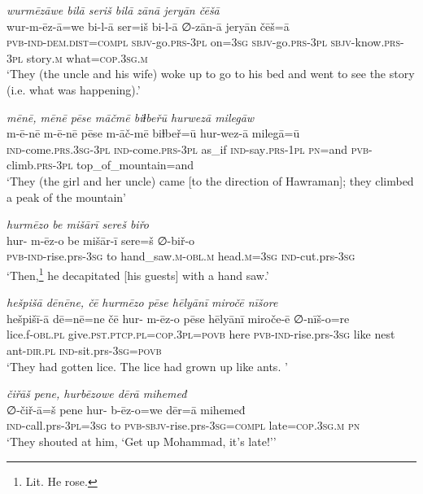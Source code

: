 \ea \label{ŽP.67}
\textit{wurmēzāwe bilā seriš bilā zānā jeryān čēšā} \\ 
\gll wur-m-ēz-ā=we bi-l-ā ser=iš bi-l-ā ∅-zān-ā jeryān čēš=ā \\ 
 \textsc{pvb-}\textsc{ind-}\textsc{dem.dist}\textsc{=compl} \textsc{sbjv-}go\textsc{.prs}\textsc{-3pl} on\textsc{=3sg} \textsc{sbjv-}go\textsc{.prs}\textsc{-3pl} \textsc{sbjv-}know\textsc{.prs}\textsc{-3pl} story\textsc{.m} what\textsc{=cop}\textsc{.3sg}\textsc{.m} \\ 
\glt `They (the uncle and his wife) woke up to go to his bed and went to see the story (i.e. what was happening).'
\z 
 
\ea \label{ŽP.186}
\textit{mēnē, mēnē pēse māčmē biɫbeřū hurwezā milegāw} \\ 
\gll m-ē-nē m-ē-nē pēse m-āč-mē biɫbeř=ū hur-wez-ā milegā=ū \\ 
 \textsc{ind-}come\textsc{.prs}\textsc{.3sg}\textsc{-3pl} \textsc{ind-}come\textsc{.prs}\textsc{-3pl} as\_if \textsc{ind-}say\textsc{.prs}\textsc{-1pl} \textsc{pn}=and \textsc{pvb-}climb\textsc{.prs}\textsc{-3pl} top\_of\_mountain=and \\ 
\glt `They (the girl and her uncle) came [to the direction of Hawraman]; they climbed a peak of the mountain'
\z 
 
\ea \label{BP.72}
\textit{hurmēzo be mišārī sereš biřo} \\ 
\gll hur- m-ēz-o be mišār-ī sere=š ∅-biř-o \\ 
 \textsc{pvb-}\textsc{ind-}rise.prs\textsc{-3sg} to hand\_saw\textsc{.m}\textsc{-obl}\textsc{.m} head\textsc{.m}\textsc{=3sg} \textsc{ind-}cut.prs\textsc{-3sg} \\ 
\glt `Then,\footnote{Lit. He rose.} he decapitated [his guests] with a hand saw.'
\z 
 
\ea \label{BP.151}
\textit{hešpišā dēnēne, čē hurmēzo pēse hēlyānī miročē nīšore} \\ 
\gll hešpišī-ā dē=nē=ne čē hur- m-ēz-o pēse hēlyānī miroče-ē ∅-nīš-o=re \\ 
 lice.f\textsc{-obl}\textsc{.pl} give\textsc{.pst}\textsc{.ptcp}\textsc{.pl}\textsc{=cop}\textsc{.3pl}\textsc{=\textsc{povb}} here \textsc{pvb-}\textsc{ind-}rise.prs\textsc{-3sg} like nest ant\textsc{-dir}\textsc{.pl} \textsc{ind-}sit.prs\textsc{-3sg}\textsc{=\textsc{povb}} \\ 
\glt `They had gotten lice. The lice had grown up like ants. '
\z 
 
\ea \label{BP.192}
\textit{čiřāš pene, hurbēzowe dērā mihemeđ} \\ 
\gll ∅-čiř-ā=š pene hur- b-ēz-o=we dēr=ā mihemeđ \\ 
 \textsc{ind-}call.prs\textsc{-3pl}\textsc{=3sg} to \textsc{pvb-}\textsc{sbjv-}rise.prs\textsc{-3sg}\textsc{=compl} late\textsc{=cop}\textsc{.3sg}\textsc{.m} \textsc{pn} \\ 
\glt `They shouted at him, ‘Get up Mohammad, it’s late!’'
\z 
 
